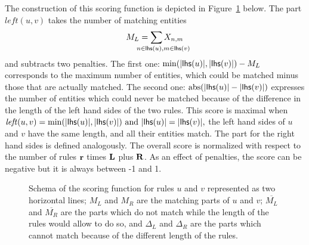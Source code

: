 \documentclass[a4paper,twoside]{article}
\begin{document}
The construction of this scoring function is depicted in Figure~\ref{fig:scoring} below.
The part $\mathit{left}(u,v)$ takes the number of matching entities $$M_L=\sum_{\mathrlap{n \in \lhs{u}, m \in \lhs{v}}} X_{n,m}$$ and subtracts two penalties. The first one: $\min(|\mathsf{lhs}(u)|, |\mathsf{lhs}(v)|) - M_L$ corresponds to the maximum number of entities, which could be matched minus those that are actually matched. The second one: 
$\mathop{\mathrm{abs}}(|\mathsf{lhs}(u)| - |\mathsf{lhs}(v)|)$ expresses the number of entities which could never be matched because of the difference in the length of the left hand sides of  the two rules.
This score is maximal when $\mathit{left}(u,v) = \min(|\mathsf{lhs}(u)|, |\mathsf{lhs}(v)|) \text{ and } |\mathsf{lhs}(u)| = |\mathsf{lhs}(v)|,$ \ie the left hand sides of $u$ and $v$ have the same length, and all their entities match. 
The part for the right hand sides is defined analogously.
The overall score is normalized with respect to the number of rules $\mathbf{r}$ times $\mathbf{L}$ plus $\mathbf{R}$. As an effect of penalties, the score can be negative but it is always between -1 and 1.


\begin{figure}[t]
  \begin{center}
\end{center}
  \caption{\label{fig:scoring}
Schema of the scoring function for rules $u$ and $v$ represented as two horizontal lines; $M_L$ and $M_R$ are the matching parts of  $u$ and $v$;   
$\overline{M_L}$ and $\overline{M_R}$ are the parts which do not match while the length of the rules would allow to do so, and $\Delta_L$ and $\Delta_R$ are the parts which cannot match because of the different length of the rules.}
\end{figure}
\end{document}
